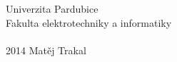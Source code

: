 \begin{titlepage}
\renewcommand{\baselinestretch}{1} %
\begin{center}

\Large\sc
Univerzita Pardubice\\
Fakulta elektrotechniky a informatiky\\[90mm]

{\Huge{}}\\[90mm]

2014 \hfill Matěj Trakal

\begin{comment}
	\begin{tabular}{lp{7cm}r}
	2014 && Matěj Trakal
	\end{tabular}
\end{comment}


\end{center}
\end{titlepage} %
\normalsize %






\begin{comment}
	\newpage
	\begin{titlepage} %
	{\Large\bf Analýza možností nasazení Cloud computing}\\ %
	\vspace{5mm}
	???Katedra informačních technologií\\ %
	\end{center}
	\vspace{15mm}
	
	\large
	\noindent Vedoucí bakalářské práce: ??? Josef Horálek %
	
	???Katedra softwarových technologií
	\vspace{1mm} 
	
	\noindent Studijní program: Informační technologie %
	
	\vspace{20mm}
	
	\begin{center}
	2010 %
	\end{center}
	
	\end{titlepage} %
	\normalsize %
\end{comment}